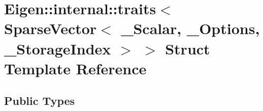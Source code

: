\hypertarget{struct_eigen_1_1internal_1_1traits_3_01_sparse_vector_3_01___scalar_00_01___options_00_01___storage_index_01_4_01_4}{}\section{Eigen\+::internal\+::traits$<$ Sparse\+Vector$<$ \+\_\+\+Scalar, \+\_\+\+Options, \+\_\+\+Storage\+Index $>$ $>$ Struct Template Reference}
\label{struct_eigen_1_1internal_1_1traits_3_01_sparse_vector_3_01___scalar_00_01___options_00_01___storage_index_01_4_01_4}
\subsection*{Public Types}
